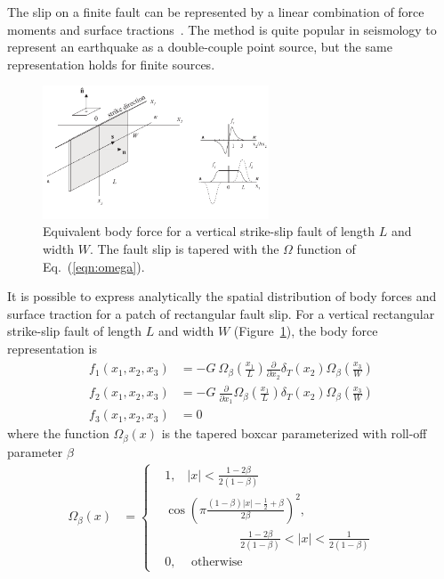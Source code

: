 \documentclass[10pt]{article}
\begin{document}
The slip on a finite fault can be represented by a linear combination of force moments and surface tractions~\citep{aki&richards80a}. The method is quite popular in seismology to represent an earthquake as a double-couple point source, but the same representation holds for finite sources.
%
\begin{figure}[h]
\centering
\includegraphics[width=0.6\textwidth]{geometry_finite_fault}
\caption{\small Equivalent body force for a vertical strike-slip fault of length $L$ and width $W$. The fault slip is tapered with the $\Omega$ function of Eq.~(\ref{eqn:omega}).}
\label{fig:geometry_finite_fault}
\end{figure}
%
It is possible to express analytically the spatial distribution of body forces and surface traction for a patch of rectangular fault slip. For a vertical rectangular strike-slip fault of length $L$ and width $W$ (Figure~\ref{fig:geometry_finite_fault}), the body force representation is
\begin{equation}\label{eqn:body-force}
\begin{aligned}
f_1(x_1,x_2,x_3)&=-G~ \Omega_\beta\!\left(\frac{x_1}{L}\right)\frac{\partial}{\partial x_2}\delta_T\!\left(x_2\right)\Omega_\beta\!\left(\frac{x_3}{W}\right)\\
f_2(x_1,x_2,x_3)&=-G~ \frac{\partial}{\partial x_1}\Omega_\beta\!\left(\frac{x_1}{L}\right)\delta_T\!\left(x_2\right)\Omega_\beta\!\left(\frac{x_3}{W}\right)\\
f_3(x_1,x_2,x_3)&=0
\end{aligned}
\end{equation}
where the function $\Omega_\beta(x)$ is the tapered boxcar parameterized with roll-off parameter $\beta$
\begin{equation}\label{eqn:omega}
\begin{aligned}
\Omega_{\beta}(x)&=%
\left\{\begin{aligned}%
&1\text{,}\quad|x|<\frac{1-2\beta}{2(1-\beta)}\\
&\cos\left(\pi\frac{(1-\beta)|x|-\frac{1}{2}+\beta}{2\beta}\right)^2
\text{,}\\
& \qquad\qquad\qquad\frac{1-2\beta}{2(1-\beta)}<|x|<\frac{1}{2(1-\beta)}& &\\
&0\text{,}\quad\text{ otherwise}%
\end{aligned}\right.
\end{aligned}
\end{equation}
\end{document}
